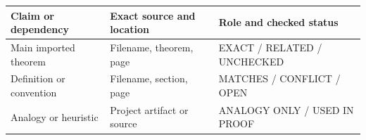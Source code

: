 \begin{tabular}{p{}p{}p{}}
Claim or dependency & Exact source and location & Role and checked status \\
\hline
Main imported theorem & Filename, theorem, page & EXACT / RELATED / UNCHECKED \\
Definition or convention & Filename, section, page & MATCHES / CONFLICT / OPEN \\
Analogy or heuristic & Project artifact or source & ANALOGY ONLY / USED IN PROOF \\
\end{tabular}
